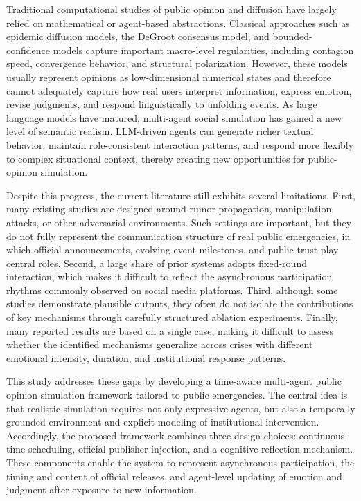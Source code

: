 \documentclass[11pt]{article}
\begin{document}
Traditional computational studies of public opinion and diffusion have largely relied on mathematical or agent-based abstractions. Classical approaches such as epidemic diffusion models, the DeGroot consensus model, and bounded-confidence models capture important macro-level regularities, including contagion speed, convergence behavior, and structural polarization. However, these models usually represent opinions as low-dimensional numerical states and therefore cannot adequately capture how real users interpret information, express emotion, revise judgments, and respond linguistically to unfolding events. As large language models have matured, multi-agent social simulation has gained a new level of semantic realism. LLM-driven agents can generate richer textual behavior, maintain role-consistent interaction patterns, and respond more flexibly to complex situational context, thereby creating new opportunities for public-opinion simulation.

Despite this progress, the current literature still exhibits several limitations. First, many existing studies are designed around rumor propagation, manipulation attacks, or other adversarial environments. Such settings are important, but they do not fully represent the communication structure of real public emergencies, in which official announcements, evolving event milestones, and public trust play central roles. Second, a large share of prior systems adopts fixed-round interaction, which makes it difficult to reflect the asynchronous participation rhythms commonly observed on social media platforms. Third, although some studies demonstrate plausible outputs, they often do not isolate the contributions of key mechanisms through carefully structured ablation experiments. Finally, many reported results are based on a single case, making it difficult to assess whether the identified mechanisms generalize across crises with different emotional intensity, duration, and institutional response patterns.

This study addresses these gaps by developing a time-aware multi-agent public opinion simulation framework tailored to public emergencies. The central idea is that realistic simulation requires not only expressive agents, but also a temporally grounded environment and explicit modeling of institutional intervention. Accordingly, the proposed framework combines three design choices: continuous-time scheduling, official publisher injection, and a cognitive reflection mechanism. These components enable the system to represent asynchronous participation, the timing and content of official releases, and agent-level updating of emotion and judgment after exposure to new information.
\end{document}
